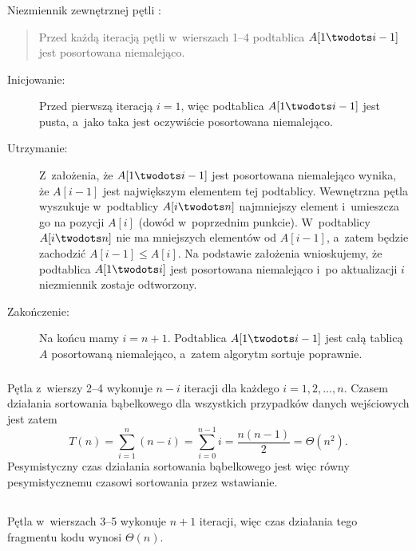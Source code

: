 \subsubsection{} %
Niezmiennik zewnętrznej pętli :
\begin{quote}
Przed każdą iteracją pętli  w~wierszach 1--4 podtablica $A[1\twodots i-1]$ jest posortowana niemalejąco.
\end{quote}
\begin{description}
	\item[Inicjowanie:] Przed pierwszą iteracją $i=1$, więc podtablica $A[1\twodots i-1]$ jest pusta, a~jako taka jest oczywiście posortowana niemalejąco.
	\item[Utrzymanie:] Z~założenia, że $A[1\twodots i-1]$ jest posortowana niemalejąco wynika, że $A[i-1]$ jest największym elementem tej podtablicy. Wewnętrzna pętla  wyszukuje w~podtablicy $A[i\twodots n]$ najmniejszy element i~umieszcza go na pozycji $A[i]$ (dowód w~poprzednim punkcie). W~podtablicy $A[i\twodots n]$ nie ma mniejszych elementów od $A[i-1]$, a~zatem będzie zachodzić $A[i-1]\le A[i]$. Na podstawie założenia wnioskujemy, że podtablica $A[1\twodots i]$ jest posortowana niemalejąco i~po aktualizacji $i$ niezmiennik zostaje odtworzony.
	\item[Zakończenie:] Na końcu mamy $i=n+1$. Podtablica $A[1\twodots i-1]$ jest całą tablicą $A$ posortowaną niemalejąco, a~zatem algorytm sortuje poprawnie.
\end{description}

\subsubsection{} %
Pętla  z~wierszy 2--4 wykonuje $n-i$ iteracji dla każdego $i=1,2,\dots,n$. Czasem działania sortowania bąbelkowego dla wszystkich przypadków danych wejściowych jest zatem
\[
	T(n) = \sum_{i=1}^n(n-i) = \sum_{i=0}^{n-1}i = \frac{n(n-1)}{2} = \Theta(n^2).
\]
Pesymistyczny czas działania sortowania bąbelkowego jest więc równy pesymistycznemu czasowi sortowania przez wstawianie.

\subsection{} %

\subsubsection{} %
Pętla  w~wierszach 3--5 wykonuje $n+1$ iteracji, więc czas działania tego fragmentu kodu wynosi $\Theta(n)$.


